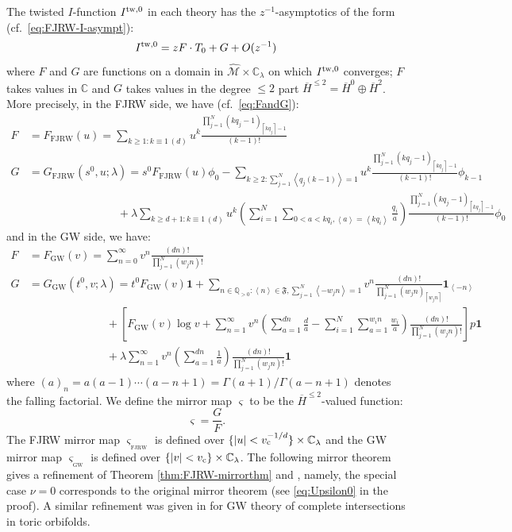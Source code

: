\documentclass[11pt]{amsart}
\theoremstyle{definition} %
\theoremstyle{remark} %
\newcommand{\CC}{\mathbb C}
\newcommand{\QQ}{\mathbb Q}
\newcommand{\tw}{{\rm tw}}
\def\GW{\operatorname{\text{GW}}}
\def\fracp#1{\left\langle #1 \right\rangle}
\def\ceil#1{\left \lceil #1 \right \rceil}
\newcommand{\cM}{\mathcal{M}}
\newcommand{\hcM}{\widehat{\cM}}
\newcommand{\frF}{\mathfrak{F}}
\newcommand{\unit}{\boldsymbol{1}}
\newcommand{\FJRW}{{\operatorname{FJRW}}}
\newcommand{\sFJRW}{\operatorname{_{FJRW}}}
\renewcommand{\GW}{{\operatorname{GW}}}
\newcommand{\sGW}{\operatorname{_{GW}}}
\newcommand{\ov}{\overline}
\newcommand{\vc}{v_{\rm c}}
\begin{document}
The twisted $I$-function $I^{\tw,0}$ in each theory 
has the $z^{-1}$-asymptotics of the form (cf.\ 
\eqref{eq:FJRW-I-asympt}): 
\begin{equation} 
\label{eq:z-asympt-Itw}
I^{\tw,0} = z F \cdot T_0 + G + O(z^{-1}) 
\end{equation} 
where $F$ and $G$ are functions on a domain 
in $\hcM \times \CC_{\lambda}$ on which $I^{\tw,0}$ converges; 
$F$ takes values in $\CC$ and $G$ takes values in 
the degree $\le 2$ part 
$\ov{H}^{\le 2}=\ov{H}^{0}\oplus \ov{H}^2$. 
More precisely, in the FJRW side, we have
(cf.~\eqref{eq:FandG}): 
\begin{align*}  
F & = F_{\FJRW}(u)  =  
\sum_{k \ge 1 : k \equiv 1 \, (d)} 
u^k 
\frac{
\prod_{j=1}^N 
(kq_j-1)_{\ceil{kq_j}-1}} 
{(k-1)!} \\ 
G & = G_{\FJRW}(s^0,u;\lambda) = s^0 F_{\FJRW}(u) \phi_0 - 
\sum_{k\ge 2: \sum_{j=1}^N \fracp{q_j(k-1)} = 1} 
u^k 
\frac{
\prod_{j=1}^N (kq_j-1)_{\ceil{k q_j}-1}} 
{(k-1)!} 
\phi_{k-1} \\
& \qquad \qquad \qquad \qquad+ 
\lambda\sum_{k\ge d+1: k\equiv 1 \, (d)} 
u^k \left( \sum_{i=1}^N 
\sum_{0<a<k q_i, \fracp{a} = \fracp{kq_i}}
\frac{q_i}{a}\right) 
\frac{
 \prod_{j=1}^N (kq_j-1)_{\ceil{kq_j}-1}} 
{(k-1)!} 
\phi_0  
\end{align*} 
and in the GW side, we have: 
\begin{align*} 
F &= F_{\GW}(v)  =  \sum_{n=0}^\infty  
v^n \frac{(dn)!}{\prod_{j=1}^N (w_j n)! }  
\\ 
G &= G_{\GW}(t^0,v;\lambda) = t^0 F_{\GW}(v) \unit + 
\sum_{n\in \QQ_{>0}: \fracp{n} \in\frF, 
\sum_{j=1}^N \fracp{-w_j n}=1} 
v^n \frac{(dn)!}{\prod_{j=1}^N (w_jn)_{\ceil{w_jn}} } \unit_{\fracp{-n}} 
\\ 
& \qquad \qquad \qquad \quad  + \left [   F_{\GW}(v) \log v + 
\sum_{n=1}^\infty v^n 
\left( 
\sum_{a=1}^{dn} \frac{d}{a} - \sum_{i=1}^N \sum_{a=1}^{w_in} 
\frac{w_i}{a} \right) 
\frac{ (dn)!} {\prod_{j=1}^N (w_j n)!} 
\right ] p \unit \\
& \qquad \qquad \qquad \quad 
+ \lambda \sum_{n=1}^{\infty}  
v^n \left(\sum_{a=1}^{dn} \frac{1}{a} \right) 
\frac{(dn)!}{\prod_{j=1}^N (w_j n)!} \unit 
\end{align*} 
where $(a)_n = a(a-1) \cdots (a-n+1) = \Gamma(a+1)/\Gamma(a-n+1)$ 
denotes the falling factorial. 
We define the mirror map $\varsigma$ to be the 
$\ov{H}^{\le 2}$-valued function: 
\begin{equation} 
\label{eq:mirrormap} 
\varsigma = \frac{G}{F}. 
\end{equation} 
The FJRW mirror map $\varsigma_{\sFJRW}$ 
is defined over 
$\{|u|< \vc^{-1/d}\}\times \CC_\lambda$ 
and the GW mirror map $\varsigma_{\sGW}$ 
is defined over 
$\{|v|< \vc\} \times \CC_\lambda$. 
The following mirror theorem gives a refinement of 
Theorem \ref{thm:FJRW-mirrorthm} 
and \cite{CCLT,CCIT:computing}, 
namely, the special case $\nu=0$ corresponds to 
the original mirror theorem 
(see \eqref{eq:Upsilon0} in the proof). 
A similar refinement was given in \cite[Theorem 4.6]{Iritani:period} 
for GW theory of complete intersections 
in toric orbifolds. 
\end{document}
